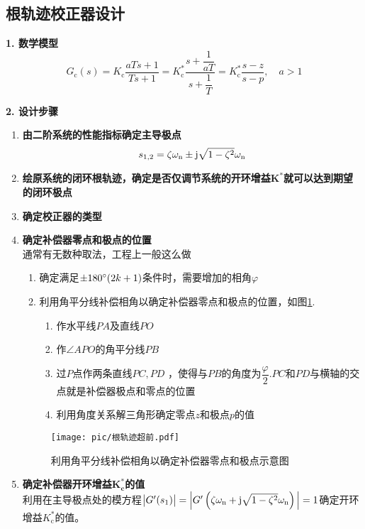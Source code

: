 \subsection{根轨迹校正器设计}

\noindent \textbf{1. 数学模型}
\begin{equation}
	G_{\text{c}}(s) = K_\text{c} \dfrac{aTs+1}{Ts + 1} = K_\text{c}^* \dfrac{s + \dfrac{1}{aT}}{s + \dfrac{1}{T}} = K_\text{c}^* \dfrac{s - z}{s - p}, \quad a>1
\end{equation}

\noindent \textbf{2. 设计步骤}
\begin{enumerate}
	\item \textbf{由二阶系统的性能指标确定主导极点}
	\begin{equation}
		s_{1,2} = \zeta \omega_{{\rm{n}}} \pm \text{j} \sqrt{1 - \zeta^2} \omega_{{\rm{n}}}
	\end{equation}
	\item \textbf{绘原系统的闭环根轨迹，确定是否仅调节系统的开环增益$\bm{K^*}$就可以达到期望的闭环极点}
	\item \textbf{确定校正器的类型}
	\item \textbf{确定补偿器零点和极点的位置}\\
	通常有无数种取法，工程上一般这么做\vspace*{-0.5em}
	\begin{enumerate}[\hspace*{1em}1.]
		\item 确定满足$\pm180{}^{\circ}(2k+1)$条件时，需要增加的相角$\varphi$
		\item 利用角平分线补偿相角以确定补偿器零点和极点的位置，如图\ref{根轨迹超前}.
		\begin{enumerate}[(1)  ]
			\item 作水平线$PA$及直线$PO$
			\item 作$\angle APO$的角平分线$PB$
			\item 过$P$点作两条直线$PC,PD$ ，使得与$PB$的角度为$\dfrac{\varphi}{2}$.$PC$和$PD$与横轴的交点就是补偿器极点和零点的位置
			\item 利用角度关系解三角形确定零点$z$和极点$p$的值
		\end{enumerate}
	\end{enumerate}
	\begin{figure}[!htb]
		\centering
		\texttt{[image: pic/根轨迹超前.pdf]}
		\vspace*{-1em}
		\caption{利用角平分线补偿相角以确定补偿器零点和极点示意图}
		\label{根轨迹超前}
	\end{figure}
	\item \textbf{确定补偿器开环增益$\bm{K_\text{c}^*}$的值}\\
	利用在主导极点处的模方程$\big|G'(s_1)\big|=\Big|G'\left(\zeta \omega_{{\rm{n}}} + \text{j} \sqrt{1 - \zeta^2} \omega_{{\rm{n}}}\right)\Big| = 1$确定开环增益$K_\text{c}^*$的值。
\end{enumerate}

